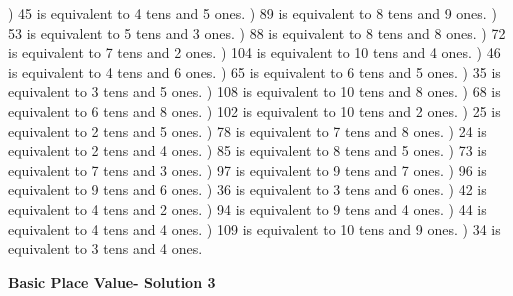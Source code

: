 \documentclass{article}%
\begin{document}
) 45 is equivalent to  4 tens and 5 ones.%
) 89 is equivalent to  8 tens and 9 ones.%
) 53 is equivalent to  5 tens and 3 ones.%
) 88 is equivalent to  8 tens and 8 ones.%
) 72 is equivalent to  7 tens and 2 ones.%
) 104 is equivalent to  10 tens and 4 ones.%
) 46 is equivalent to  4 tens and 6 ones.%
) 65 is equivalent to  6 tens and 5 ones.%
) 35 is equivalent to  3 tens and 5 ones.%
) 108 is equivalent to  10 tens and 8 ones.%
) 68 is equivalent to  6 tens and 8 ones.%
) 102 is equivalent to  10 tens and 2 ones.%
) 25 is equivalent to  2 tens and 5 ones.%
) 78 is equivalent to  7 tens and 8 ones.%
) 24 is equivalent to  2 tens and 4 ones.%
) 85 is equivalent to  8 tens and 5 ones.%
) 73 is equivalent to  7 tens and 3 ones.%
) 97 is equivalent to  9 tens and 7 ones.%
) 96 is equivalent to  9 tens and 6 ones.%
) 36 is equivalent to  3 tens and 6 ones.%
) 42 is equivalent to  4 tens and 2 ones.%
) 94 is equivalent to  9 tens and 4 ones.%
) 44 is equivalent to  4 tens and 4 ones.%
) 109 is equivalent to  10 tens and 9 ones.%
) 34 is equivalent to  3 tens and 4 ones.%
\newline%
\newpage%
\large%
\begin{center}%
\textbf{Basic Place Value- Solution 3}%
\newline%
\end{center} \normalsize%
\end{document}
